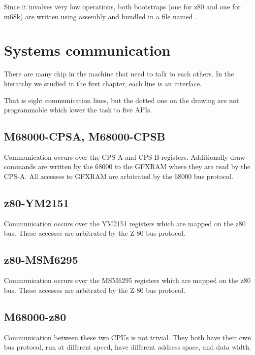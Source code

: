 Since it involves very low operations, both bootstraps (one for z80 and one for m68k) are written using assembly and bundled in a file named .





\section{Systems communication}

There are many chip in the machine that need to talk to each others. In the hierarchy we studied in the first chapter, each line is an interface. 


That is eight communication lines, but the dotted one on the drawing are not programmable which lower the task to five APIs.

\subsection{M68000-CPSA, M68000-CPSB} Communication occurs over the CPS-A and CPS-B registers. Additionally draw commands are written by the 68000 to the GFXRAM where they are read by the CPS-A. All accesses to GFXRAM are arbitrated by the 68000 bus protocol.

\subsection{z80-YM2151} Communication occurs over the YM2151 registers which are mapped on the z80 bus. These accesses are arbitrated by the Z-80 bus protocol.

\subsection{z80-MSM6295} Communication  occurs over the MSM6295 registers which are mapped on the z80 bus. These accesses are arbitrated by the Z-80 bus protocol. 

\subsection{M68000-z80} Communication between these two CPUs is not trivial. They both have their own bus protocol, run at different speed, have different address space, and data width.

